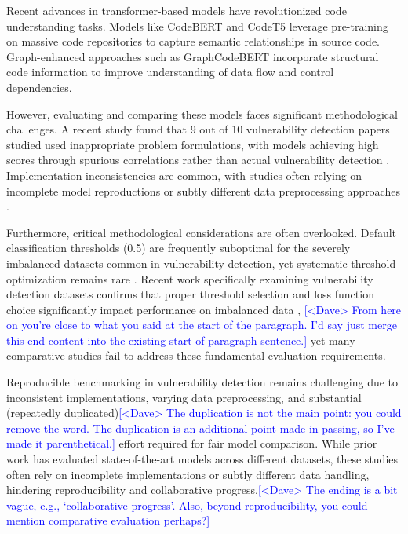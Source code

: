 \documentclass[letterpaper]{article}
\newcommand{\note}[2][red]{\textcolor{#1}{#2}}
\newcommand{\notedme}[1]{\note[blue]{[<Dave> #1]}}
\begin{document}
Recent advances in transformer-based models have revolutionized code understanding tasks. Models like CodeBERT \citep{feng2020codebert} and CodeT5 \citep{wang2021codet5} leverage pre-training on massive code repositories to capture semantic relationships in source code. Graph-enhanced approaches such as GraphCodeBERT \citep{guo2021graphcodebert} incorporate structural code information to improve understanding of data flow and control dependencies.

However, evaluating and comparing these models faces significant methodological challenges. A recent study found that 9 out of 10 vulnerability detection papers studied used inappropriate problem formulations, with models achieving high scores through spurious correlations rather than actual vulnerability detection \citep{risse2025top}. Implementation inconsistencies are common, with studies often relying on incomplete model reproductions or subtly different data preprocessing approaches \citep{codecse2024}.

Furthermore, critical methodological considerations are often overlooked. Default classification thresholds (0.5) are frequently suboptimal for the severely imbalanced datasets common in vulnerability detection, yet systematic threshold optimization remains rare \citep{ghost2021, leevy2023optimal}. Recent work specifically examining vulnerability detection datasets confirms that proper threshold selection and loss function choice significantly impact performance on imbalanced data \citep{he2025imbalance}, \notedme{From here on you're close to what you said at the start of the paragraph. I'd say just merge this end content into the existing start-of-paragraph sentence.} yet many comparative studies fail to address these fundamental evaluation requirements.

Reproducible benchmarking in vulnerability detection remains challenging due to inconsistent implementations, varying data preprocessing, and substantial (repeatedly duplicated)\notedme{The duplication is not the main point: you could remove the word. The duplication is an additional point made in passing, so I've made it parenthetical.} effort required for fair model comparison. While prior work has evaluated state-of-the-art models across different datasets, these studies often rely on incomplete implementations or subtly different data handling, hindering reproducibility and collaborative progress.\notedme{The ending is a bit vague, e.g., `collaborative progress'. Also, beyond reproducibility, you could mention comparative evaluation perhaps?}
\end{document}
